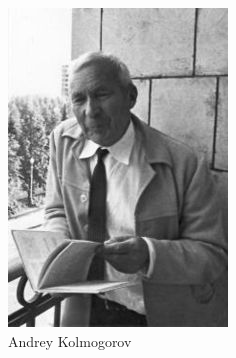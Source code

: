 \documentclass[xetex]{beamer}
\begin{document}
\begin{frame}
\begin{figure}
\begin{minipage}{.3\textwidth}
\includegraphics[width=\linewidth]{kolmogorov}
\caption*{Andrey Kolmogorov}
\label{fig:test3}
\end{minipage}
\end{figure}
  

\end{frame}
\end{document}
